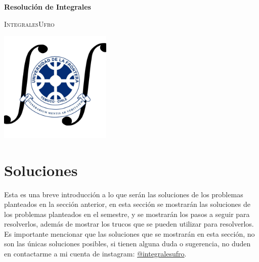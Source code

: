 \documentclass[a4paper]{article}
\begin{document}
\begin{titlepage}
    \begin{center}
        \vspace*{1cm}

        \LARGE\textbf{Resolución de Integrales}

        \vspace{0.5cm}
        

        \vspace{1cm}

        \textsc{IntegralesUfro}

        \vspace{5cm}

        \includegraphics[width=0.4\textwidth]{Imagenes/Logo.png}

        \vspace{0.8cm}
    \end{center}
\end{titlepage}

\newpage

\pagestyle{fancy}
\fancyhead{} %


\tableofcontents



\section{Soluciones}    
Esta es una breve introducción a lo que serán las soluciones de los problemas planteados en la sección anterior, 
en esta sección se mostrarán las soluciones de los problemas planteados en el semestre, y se mostrarán los pasos a seguir para resolverlos, 
además de mostrar los trucos que se pueden utilizar para resolverlos. \\

Es importante mencionar que las soluciones que se mostrarán en esta sección, no son las únicas soluciones posibles, si tienen alguna duda o sugerencia, no duden en 
contactarme a mi cuenta de instagram: \href{https://www.instagram.com/integralesufro/}{@integralesufro}. \\
\end{document}
